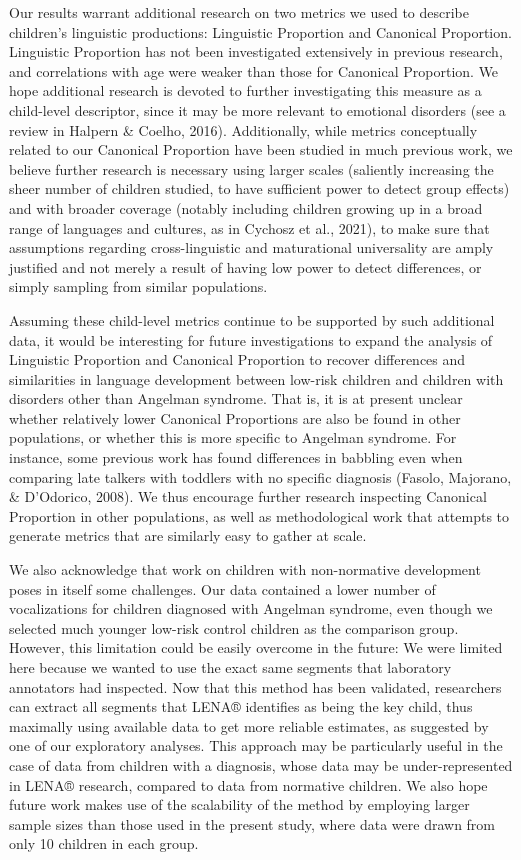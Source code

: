 \documentclass[english,,man]{apa6}
\begin{document}
Our results warrant additional research on two metrics we used to describe children's linguistic productions: Linguistic Proportion and Canonical Proportion. Linguistic Proportion has not been investigated extensively in previous research, and correlations with age were weaker than those for Canonical Proportion. We hope additional research is devoted to further investigating this measure as a child-level descriptor, since it may be more relevant to emotional disorders (see a review in Halpern \& Coelho, 2016). Additionally, while metrics conceptually related to our Canonical Proportion have been studied in much previous work, we believe further research is necessary using larger scales (saliently increasing the sheer number of children studied, to have sufficient power to detect group effects) and with broader coverage (notably including children growing up in a broad range of languages and cultures, as in Cychosz et al., 2021), to make sure that assumptions regarding cross-linguistic and maturational universality are amply justified and not merely a result of having low power to detect differences, or simply sampling from similar populations.

Assuming these child-level metrics continue to be supported by such additional data, it would be interesting for future investigations to expand the analysis of Linguistic Proportion and Canonical Proportion to recover differences and similarities in language development between low-risk children and children with disorders other than Angelman syndrome. That is, it is at present unclear whether relatively lower Canonical Proportions are also be found in other populations, or whether this is more specific to Angelman syndrome. For instance, some previous work has found differences in babbling even when comparing late talkers with toddlers with no specific diagnosis (Fasolo, Majorano, \& D'Odorico, 2008). We thus encourage further research inspecting Canonical Proportion in other populations, as well as methodological work that attempts to generate metrics that are similarly easy to gather at scale.

We also acknowledge that work on children with non-normative development poses in itself some challenges. Our data contained a lower number of vocalizations for children diagnosed with Angelman syndrome, even though we selected much younger low-risk control children as the comparison group. However, this limitation could be easily overcome in the future: We were limited here because we wanted to use the exact same segments that laboratory annotators had inspected. Now that this method has been validated, researchers can extract all segments that LENA® identifies as being the key child, thus maximally using available data to get more reliable estimates, as suggested by one of our exploratory analyses. This approach may be particularly useful in the case of data from children with a diagnosis, whose data may be under-represented in LENA® research, compared to data from normative children. We also hope future work makes use of the scalability of the method by employing larger sample sizes than those used in the present study, where data were drawn from only 10 children in each group.
\end{document}
